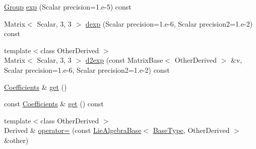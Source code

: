 \begin{DoxyCompactItemize}
\item 
\hyperlink{class_lie_algebra_base_3_01_matrix_3_01typename_01internal_1_1traits_3_01_derived_01_4_1_1_scalabfa0bdce6d9781ee940346c3f6d91f4e_ac400b52908b18fbf91ce3f942c2841e9}{Group} \hyperlink{class_lie_algebra_base_3_01_matrix_3_01typename_01internal_1_1traits_3_01_derived_01_4_1_1_scalabfa0bdce6d9781ee940346c3f6d91f4e_ae6f9ae43344c5314bb25ffd8d9df3b6b}{exp} (Scalar precision=1.e-\/5) const
\item 
Matrix$<$ Scalar, 3, 3 $>$ \hyperlink{class_lie_algebra_base_3_01_matrix_3_01typename_01internal_1_1traits_3_01_derived_01_4_1_1_scalabfa0bdce6d9781ee940346c3f6d91f4e_a8b415ebfce966f09b845e7094bc4779b}{dexp} (Scalar precision=1.e-\/6, Scalar precision2=1.e-\/2) const
\item 
{\footnotesize template$<$class Other\+Derived $>$ }\\Matrix$<$ Scalar, 3, 3 $>$ \hyperlink{class_lie_algebra_base_3_01_matrix_3_01typename_01internal_1_1traits_3_01_derived_01_4_1_1_scalabfa0bdce6d9781ee940346c3f6d91f4e_a9fb9f5bfa1694d5f7a68ee8ff6be1ed3}{d2exp} (const Matrix\+Base$<$ Other\+Derived $>$ \&v, Scalar precision=1.e-\/6, Scalar precision2=1.e-\/2) const
\item 
\hyperlink{class_lie_algebra_base_3_01_matrix_3_01typename_01internal_1_1traits_3_01_derived_01_4_1_1_scalabfa0bdce6d9781ee940346c3f6d91f4e_a36f132794b928bcf1f707bf88d392288}{Coefficients} \& \hyperlink{class_lie_algebra_base_3_01_matrix_3_01typename_01internal_1_1traits_3_01_derived_01_4_1_1_scalabfa0bdce6d9781ee940346c3f6d91f4e_a087b980c393345af2614f8a7ee5fb45f}{get} ()
\item 
const \hyperlink{class_lie_algebra_base_3_01_matrix_3_01typename_01internal_1_1traits_3_01_derived_01_4_1_1_scalabfa0bdce6d9781ee940346c3f6d91f4e_a36f132794b928bcf1f707bf88d392288}{Coefficients} \& \hyperlink{class_lie_algebra_base_3_01_matrix_3_01typename_01internal_1_1traits_3_01_derived_01_4_1_1_scalabfa0bdce6d9781ee940346c3f6d91f4e_aaf1d1fb3045b05a1a3ab60dbaeaf8a6b}{get} () const
\item 
{\footnotesize template$<$class Other\+Derived $>$ }\\Derived \& \hyperlink{class_lie_algebra_base_3_01_matrix_3_01typename_01internal_1_1traits_3_01_derived_01_4_1_1_scalabfa0bdce6d9781ee940346c3f6d91f4e_a71ba9feff1ba5b3337ad41a9537846f4}{operator=} (const \hyperlink{class_lie_algebra_base}{Lie\+Algebra\+Base}$<$ \hyperlink{class_lie_algebra_base_3_01_matrix_3_01typename_01internal_1_1traits_3_01_derived_01_4_1_1_scalabfa0bdce6d9781ee940346c3f6d91f4e_a2191d421225a2c966825db324301abba}{Base\+Type}, Other\+Derived $>$ \&other)

\end{DoxyCompactItemize}
